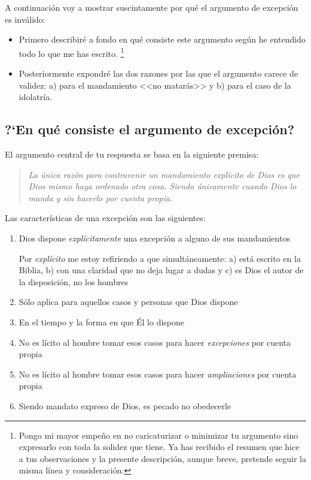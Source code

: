 \documentclass{article}
\begin{document}
A continuaci\'on voy a mostrar suscintamente por qu\'e el argumento de excepci\'on es inv\'alido:

\begin{itemize}
\item Primero describir\'e a fondo en qu\'e consiste este argumento seg\'un he entendido todo lo que me has escrito.%
    \footnote{Pongo mi mayor empe\~no en no caricaturizar o minimizar tu argumento sino expresarlo con toda la solidez que tiene. Ya has recibido el resumen que hice a tus observaciones y la presente descripci\'on, aunque breve, pretende seguir la misma l\'{i}nea y consideraci\'on.}
\item Posteriormente expondr\'e las dos razones por las que el argumento carece de validez: a) para el mandamiento <<no matar\'as>> y b) para el caso de la idolatr\'{i}a.
\end{itemize}

\subsection{?`En qu\'e consiste el argumento de excepci\'on?}

El argumento central de tu respuesta se basa en la siguiente premisa:

\begin{quote}
\emph{La \'unica raz\'on para contravenir un mandamiento expl\'{i}cito de Dios es que Dios mismo haya ordenado otra cosa. Siendo \'unicamente cuando Dios lo manda y sin hacerlo por cuenta propia.}
\end{quote}

\noindent
Las caracter\'{i}sticas de una excepci\'on son las siguientes:

\begin{enumerate}
\item Dios dispone \emph{expl\'{i}citamente} una excepci\'on a alguno de sus mandamientos
    
    Por \emph{expl\'{i}cito} me estoy refiriendo a que simult\'aneamente: a) est\'a escrito en la Biblia, b) con una claridad que no deja lugar a dudas y c) es Dios el autor de la disposici\'on, no los hombres

\item S\'olo aplica para aquellos casos y personas que Dios dispone
\item En el tiempo y la forma en que \'El lo dispone
\item No es l\'{i}cito al hombre tomar esos casos para hacer \emph{excepciones} por cuenta propia
\item No es l\'{i}cito al hombre tomar esos casos para hacer \emph{ampliaciones} por cuenta propia
\item Siendo mandato expreso de Dios, es pecado no obedecerle
\end{enumerate}
\end{document}
